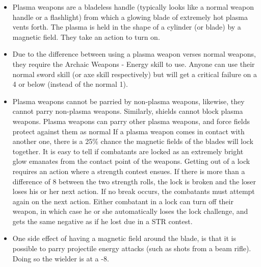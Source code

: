 \documentclass[twoside]{book}
\begin{document}
\begin{itemize}
      
  \item  Plasma weapons are a bladeless handle (typically
                   looks like a normal weapon handle or a flashlight)
                   from which a glowing blade of extremely hot plasma
                   vents forth. The plasma is held in the shape of a
                   cylinder (or blade) by a magnetic field. They take an
                   action to turn on. 
  \item  Due to the difference between using a plasma
                   weapon verses normal weapons, they require the Archaic
                   Weapons - Energy skill to use. Anyone can use their
                   normal sword skill (or axe skill respectively) but
                   will get a critical failure on a 4 or below (instead
                   of the normal 1). 
  \item  Plasma weapons cannot be parried by non-plasma
                   weapons, likewise, they cannot parry non-plasma
                   weapons. Similarly, shields cannot block plasma
                   weapons. Plasma weapons can parry other plasma
                   weapons, and force fields protect against them as
                   normal If a plasma weapon comes in contact with
                   another one, there is a 25\% chance the magnetic fields
                   of the blades will lock together. It is easy to tell
                   if combatants are locked as an extremely bright glow
                   emanates from the contact point of the weapons.
                   Getting out of a lock requires an action where a
                   strength contest ensues. If there is more than a
                   difference of 8 between the two strength rolls, the
                   lock is broken and the loser loses his or her next
                   action. If no break occurs, the combatants must
                   attempt again on the next action. Either combatant in
                   a lock can turn off their weapon, in which case he or
                   she automatically loses the lock challenge, and gets
                   the same negative as if he lost due in a STR contest.
                   
  \item  One side effect of having a magnetic field
                   around the blade, is that it is possible to parry
                   projectile energy attacks (such as shots from a beam
                   rifle). Doing so the wielder is at a -8. 
\end{itemize}
  
\end{document}
